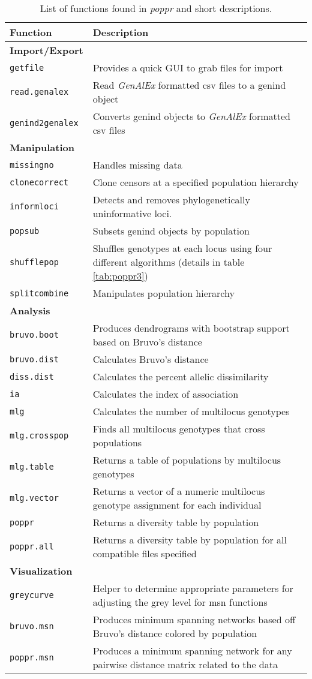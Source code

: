\begin{sidewaystable}[ph!]
\caption{List of functions found in \textit{poppr} and short descriptions.}
\label{tab:poppr1}
\begin{tabular}{ll}
\hline
Function & Description \\ 
\hline
\textbf{Import/Export} & \\
\texttt{getfile} & Provides a quick GUI to grab files for import \\
\texttt{read.genalex} & Read \textit{GenAlEx} formatted csv files to a genind object \\
\texttt{genind2genalex} & Converts genind objects to \textit{GenAlEx} formatted csv files \\
\hline
\textbf{Manipulation} & \\
\texttt{missingno} & Handles missing data \\
\texttt{clonecorrect} & Clone censors at a specified population hierarchy \\
\texttt{informloci} & Detects and removes phylogenetically uninformative loci. \\
\texttt{popsub} & Subsets genind objects by population \\
\texttt{shufflepop} & Shuffles genotypes at each locus using four different algorithms (details in table \ref{tab:poppr3}) \\
\texttt{splitcombine} & Manipulates population hierarchy \\ 
\hline
\textbf{Analysis} & \\
\texttt{bruvo.boot} & Produces dendrograms with bootstrap support based on Bruvo's distance \\
\texttt{bruvo.dist} & Calculates Bruvo's distance \\
\texttt{diss.dist} & Calculates the percent allelic dissimilarity \\
\texttt{ia} & Calculates the index of association \\
\texttt{mlg} & Calculates the number of multilocus genotypes \\
\texttt{mlg.crosspop} & Finds all multilocus genotypes that cross populations \\
\texttt{mlg.table} & Returns a table of populations by multilocus genotypes \\
\texttt{mlg.vector} & Returns a vector of a numeric multilocus genotype assignment for each individual \\
\texttt{poppr} & Returns a diversity table by population \\
\texttt{poppr.all} & Returns a diversity table by population for all compatible files specified \\
\hline
\textbf{Visualization} & \\
\texttt{greycurve} & Helper to determine appropriate parameters for adjusting the grey level for msn functions \\
\texttt{bruvo.msn} & Produces minimum spanning networks based off Bruvo's distance colored by population \\
\texttt{poppr.msn} & Produces a minimum spanning network for any pairwise distance matrix related to the data \\
\hline

\end{tabular}
\end{sidewaystable}
